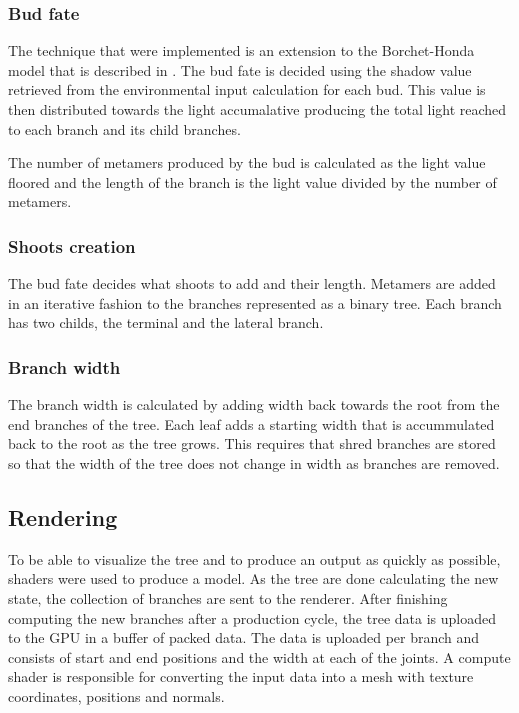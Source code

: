 \documentclass[11pt]{article} %
\begin{document}
\subsubsection{Bud fate}
The technique that were implemented is an extension to the Borchet-Honda model that is described in \citet{Palubicki:2009:STM:1531326.1531364}.
The bud fate is decided using the shadow value retrieved from the environmental input calculation for each bud.
This value is then distributed towards the light accumalative producing the total light reached to each branch and its child branches.

The number of metamers produced by the bud is calculated as the light value floored and the length of the branch is the light value divided by the number of metamers.

\subsubsection{Shoots creation}
The bud fate decides what shoots to add and their length.
Metamers are added in an iterative fashion to the branches represented as a binary tree.
Each branch has two childs, the terminal and the lateral branch.

\subsubsection{Branch width}
The branch width is calculated by adding width back towards the root from the end branches of the tree.
Each leaf adds a starting width that is accummulated back to the root as the tree grows.
This requires that shred branches are stored so that the width of the tree does not change in width as branches are removed.

\subsection{Rendering}
To be able to visualize the tree and to produce an output as quickly as possible, shaders were used to produce a model.
As the tree are done calculating the new state, the collection of branches are sent to the renderer.
After finishing computing the new branches after a production cycle, the tree data is uploaded to the GPU in a buffer of packed data.
The data is uploaded per branch and consists of start and end positions and the width at each of the joints.
A compute shader is responsible for converting the input data into a mesh with texture coordinates, positions and normals.
\end{document}
